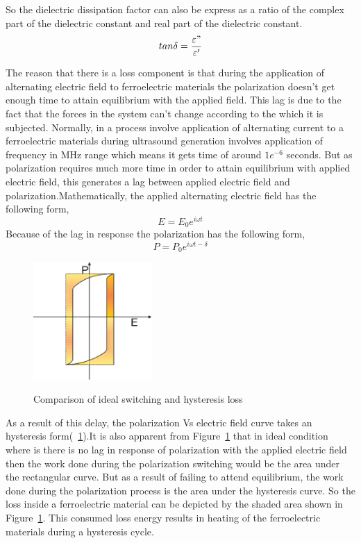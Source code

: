 So the dielectric dissipation factor can also be express as a ratio of the complex part of the dielectric constant and real part of the dielectric constant.
\begin{equation}\label{Eq:tandeltacurrentloss}
    tan\delta =\frac{\varepsilon"}{\varepsilon'}
\end{equation}

The reason that there is a loss component is that during the application of alternating electric field to ferroelectric materials the polarization doesn't get enough time to attain equilibrium with the applied field. This lag is due to the fact that the  forces in the system can't change according to the which it is subjected. Normally, in a process involve application of alternating current to a ferroelectric materials during ultrasound generation involves application of frequency in  MHz range which means it gets time of around $1e^{-6}$ seconds. But as polarization requires much more time in order to attain equilibrium with applied electric field, this generates a lag between applied electric field and polarization.Mathematically, the applied alternating electric field has the following form,
\begin{equation}\label{Eq:Elelctricfield}
    E =E_{0}e^{i\omega t}
\end{equation}
Because of the lag in response the polarization has the following form,
  \begin{equation}\label{Eq:Polarization}
    P =P_{0}e^{i\omega t-\delta}
\end{equation}
\begin{figure}[t]
\centering
	\includegraphics[width=0.4\textwidth]{Hysteresisvsideal.eps}\\
	\caption[Comparison of ideal switching and hysteresis loss]{Comparison of ideal switching and hysteresis loss}\label{fig:The ferroelectric hysteresiswithidealloss}
\end{figure} 
As a result of this delay, the polarization Vs electric field curve takes an hysteresis form(~\ref{fig:The ferroelectric hysteresiswithidealloss}).It is also apparent from Figure~\ref{fig:The ferroelectric hysteresiswithidealloss} that in ideal condition where is there is no lag in response of polarization with the applied electric field then the work done during the polarization switching would be the area under the rectangular curve. But as a result of failing to attend equilibrium, the work done during the polarization process is the area under the hysteresis curve. So the loss inside a ferroelectric material can be depicted by the shaded area shown in Figure~\ref{fig:The ferroelectric hysteresiswithidealloss}. This consumed loss energy results in heating of the ferroelectric materials during a hysteresis cycle.

